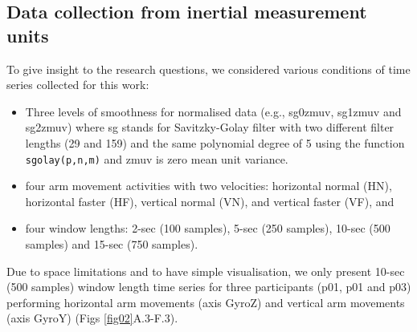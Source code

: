 \documentclass[fleqn,10pt]{wlscirep}
\begin{document}
\subsection*{Data collection from inertial measurement units} 
\label{sec:experiment:subsec:imu}
To give insight to the research questions, 
we considered various conditions of time series collected for this work: 
\begin{itemize}
\item Three levels of smoothness for normalised data 
	(e.g., sg0zmuv, sg1zmuv and sg2zmuv) where sg 
	stands for Savitzky-Golay filter with two different filter lengths (29 and 159) 
	and the same polynomial degree of 5 using the function \texttt{sgolay(p,n,m)} \cite{Rsignal}
	and zmuv is zero mean unit variance.
\item four arm movement activities with two velocities: 
	horizontal normal (HN), horizontal faster (HF), 
	vertical normal (VN), and vertical faster (VF), and
\item four window lengths: 2-sec (100 samples), 5-sec (250 samples), 
	10-sec (500 samples) and 15-sec (750 samples).
\end{itemize}
Due to space limitations and to have simple visualisation, 
we only present 10-sec (500 samples) window length time series for 
three participants (p01, p01 and p03) performing horizontal 
arm movements (axis GyroZ) and vertical arm movements (axis GyroY) (Figs \ref{fig02}A.3-F.3).
\end{document}
